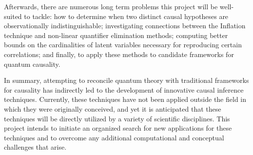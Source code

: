 \documentclass[12pt]{article}
\begin{document}
Afterwards, there are numerous long term problems this project will be well-suited to tackle: how to determine when two distinct causal hypotheses are observationally indistinguishable; investigating connections between the Inflation technique and non-linear quantifier elimination methods; computing better bounds on the cardinalities of latent variables necessary for reproducing certain correlations; and finally, to apply these methods to candidate frameworks for quantum causality.

In summary, attempting to reconcile quantum theory with traditional frameworks for causality has indirectly led to the development of innovative causal inference techniques. Currently, these techniques have not been applied outside the field in which they were originally conceived, and yet it is anticipated that these techniques will be directly utilized by a variety of scientific disciplines. This project intends to initiate an organized search for new applications for these techniques and to overcome any additional computational and conceptual challenges that arise.
\end{document}
